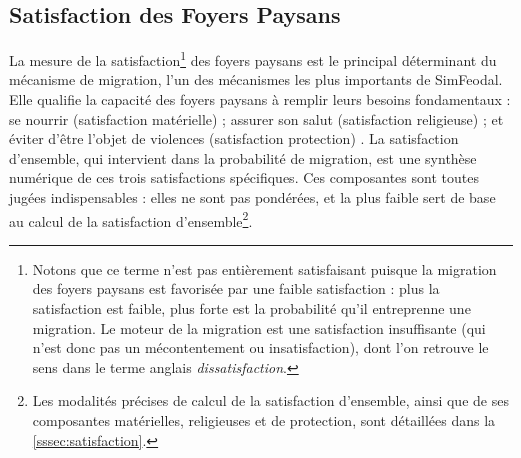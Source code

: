 
\subsection{Satisfaction des Foyers Paysans}

La mesure de la satisfaction\footnote{
	Notons que ce terme n'est pas entièrement \og satisfaisant\fg{} puisque la migration des foyers paysans est favorisée par une faible satisfaction : plus la satisfaction est faible, plus forte est la probabilité qu'il entreprenne une migration.
	Le moteur de la migration est une satisfaction insuffisante (qui n'est donc pas un mécontentement ou \og insatisfaction\fg{}), dont l'on retrouve le sens dans le terme anglais \textit{dissatisfaction}.
} des foyers paysans est le principal déterminant du mécanisme de migration, l'un des mécanismes les plus importants de SimFeodal.
Elle qualifie la capacité des foyers paysans à remplir leurs besoins fondamentaux : \og se nourrir\fg{} (satisfaction matérielle) ; \og assurer son salut\fg{} (satisfaction religieuse) ; et \og éviter d'être l'objet de violences\fg{} (satisfaction \og protection\fg{}) \autocite[Tableau 1, \ppno~309]{cura_transition_2017}.
La satisfaction d'ensemble, qui intervient dans la probabilité de migration, est une synthèse numérique de ces trois satisfactions spécifiques.
Ces composantes sont toutes jugées indispensables : elles ne sont pas pondérées, et la plus faible sert de base au calcul de la satisfaction d'ensemble\footnote{
	Les modalités précises de calcul de la satisfaction d'ensemble, ainsi que de ses composantes matérielles, religieuses et de protection, sont détaillées dans la \cref{sssec:satisfaction}.
}.
%


